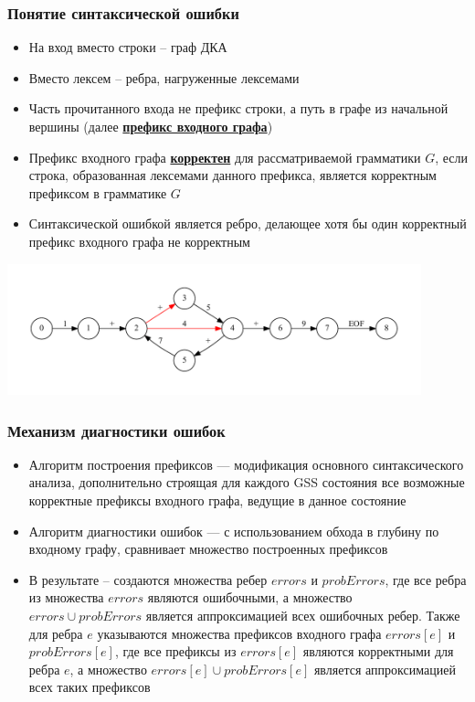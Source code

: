 \documentclass{beamer}
\begin{document}
\begin{frame}[fragile]
	\transwipe[direction=90]
	\frametitle{Понятие синтаксической ошибки}
    \begin{itemize}
        \item На вход вместо строки -- граф ДКА
        \item Вместо лексем -- ребра, нагруженные лексемами
    	\item Часть прочитанного входа не префикс строки, а путь в графе из начальной вершины (далее \uline{\textbf{префикс входного графа}})
    	\item Префикс входного графа \uline{\textbf{корректен}} для рассматриваемой грамматики $G$, если строка, образованная лексемами данного префикса, является корректным префиксом в грамматике $G$
    	\item Синтаксической ошибкой является ребро, делающее хотя бы один корректный префикс входного графа не корректным
	\end{itemize}
	\begin{center}
	            \includegraphics[width=340pt]{pictures/ErrorEdges.pdf}
	\end{center}
\end{frame}

\begin{frame}[fragile]
	\transwipe[direction=90]
	\frametitle{Механизм диагностики ошибок}
    \begin{itemize}
        \item Алгоритм построения префиксов --- модификация основного синтаксического анализа, дополнительно строящая для каждого GSS состояния все возможные корректные префиксы входного графа, ведущие в данное состояние
        \item Алгоритм диагностики ошибок --- с использованием обхода в глубину по входному графу, сравнивает множество построенных префиксов
        \item В результате -- создаются множества ребер $errors$ и $probErrors$, где все ребра из множества $errors$ являются ошибочными, а множество $errors \cup probErrors$ является аппроксимацией всех ошибочных ребер. Также для ребра $e$ указываются множества префиксов входного графа $errors[e]$ и $probErrors[e]$, где все префиксы из $errors[e]$ являются корректными для ребра $e$, а множество $errors[e] \cup probErrors[e]$ является аппроксимацией всех таких префиксов
    \end{itemize}
    
\end{frame}
\end{document}
